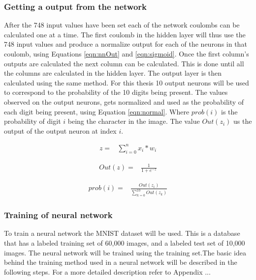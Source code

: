 \subsubsection{Getting a output from the network}

After the 748 input values have been set each of the network coulombs can be calculated one at a time. The first coulomb in the hidden layer will thus use the 748 input values and produce a normalize output for each of the neurons in that coulomb, using Equations \ref{eqn:nnOut} and \ref{eqn:sigmoid}. Once the first column's outputs are calculated the next column can be calculated. This is done until all the columns are calculated in the hidden layer. The output layer is then calculated using the same method. For this thesis 10 output neurons will be used to correspond to the probability of the 10 digits being present. The values observed on the output neurons, gets normalized and used as the probability of each digit being present, using Equation  \ref{eqn:normal}. Where $prob(i)$ is the probability of digit $i$ being the character in the image. The value $Out(z_{i})$ us the output of the output neuron at index $i$.

\begin{align}
  z =  &\displaystyle{\sum_{i=0}^{n} x_{i}*w_{i}}
\label{eqn:nnOut}
\end{align}

\begin{align}
  Out(z) =  &\displaystyle{\frac{1}{1 + e^{-z}}}
\label{eqn:sigmoid}
\end{align}

\begin{align}
  prob(i) =  &\displaystyle{\frac{Out(z_{i})}{\sum_{k=0}^{10} Out(z_{k})}}
\label{eqn:normal}
\end{align}

\subsubsection{Training of neural network}

To train a neural network the MNIST dataset will be used. This is a database that has a labeled training set of 60,000 images, and a labeled test set of 10,000 images. The neural network will be trained using the training set.The basic idea behind the training method used in a neural network will be described in the following steps. For a more detailed description refer to Appendix ...

